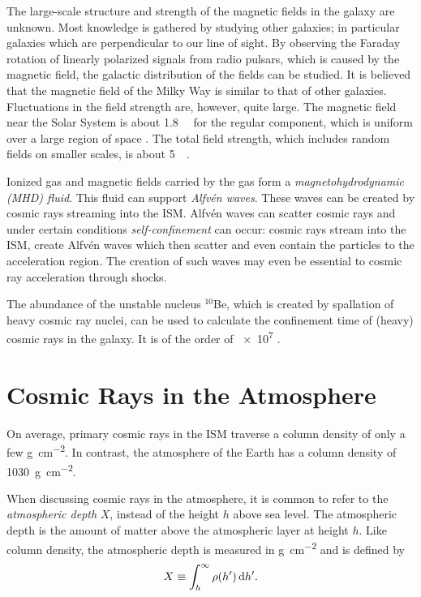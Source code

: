 The large-scale structure and strength of the magnetic fields in the galaxy are
unknown.  Most knowledge is gathered by studying other galaxies; in particular
galaxies which are perpendicular to our line of sight.  By observing the Faraday
rotation of linearly polarized signals from radio pulsars, which is caused by
the magnetic field, the galactic distribution of the fields can be studied.  It
is believed that the magnetic field of the Milky Way is similar to that of other
galaxies.  Fluctuations in the field strength are, however, quite large. The
magnetic field near the Solar System is about \SI{1.8}{\micro\gauss}
for the regular component, which is uniform over a large region of space
\cite{Han:2000}.  The total field strength, which includes random fields on
smaller scales, is about \SI{5}{\micro\gauss}.

Ionized gas and magnetic fields carried by the gas form a
\emph{magnetohydrodynamic (MHD) fluid}.  This fluid can support \emph{Alfvén
waves}.  These waves can be created by cosmic rays streaming into the ISM.
Alfvén waves can scatter cosmic rays and under certain conditions
\emph{self-confinement} can occur: cosmic rays stream into the ISM, create
Alfvén waves which then scatter and even contain the particles to the
acceleration region.  The creation of such waves may even be essential to
cosmic ray acceleration through shocks.

The abundance of the unstable nucleus $^{10}$Be, which is created by spallation
of heavy cosmic ray nuclei, can be used to calculate the confinement time of
(heavy) cosmic rays in the galaxy. It is of the order of \SI{e7}{\year}
\cite[85]{Stanev:2004}.


\section{Cosmic Rays in the Atmosphere}
\label{sec:showers}

On average, primary cosmic rays in the ISM traverse a column
density of only a few \si{\gram\per\centi\meter\squared}.  In contrast, the
atmosphere of the Earth has a column density of
\SI{1030}{\gram\per\centi\meter\squared}.

When discussing cosmic rays in the atmosphere, it is common to refer to the
\emph{atmospheric depth} $X$, instead of the height $h$ above sea level.  The
atmospheric depth is the amount of matter above the atmospheric layer at height
$h$. Like column density, the atmospheric depth is measured in
\si{\gram\per\centi\meter\squared} and is defined by
\begin{equation}
X \equiv \int_h^\infty \rho(h') \,\mathrm{d} h'.
\end{equation}

